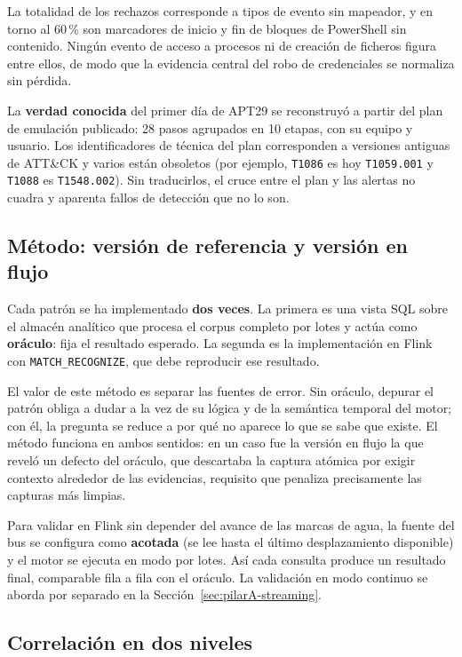La totalidad de los rechazos corresponde a tipos de evento sin mapeador, y en torno al 60\,\%
son marcadores de inicio y fin de bloques de PowerShell sin contenido. Ningún evento de
acceso a procesos ni de creación de ficheros figura entre ellos, de modo que la evidencia
central del robo de credenciales se normaliza sin pérdida.

La \textbf{verdad conocida} del primer día de APT29 se reconstruyó a partir del plan de
emulación publicado: 28 pasos agrupados en 10 etapas, con su equipo y usuario. Los
identificadores de técnica del plan corresponden a versiones antiguas de ATT\&CK y varios
están obsoletos (por ejemplo, \texttt{T1086} es hoy \texttt{T1059.001} y \texttt{T1088} es
\texttt{T1548.002}). Sin traducirlos, el cruce entre el plan y las alertas no cuadra y
aparenta fallos de detección que no lo son.

\subsection{Método: versión de referencia y versión en flujo}

Cada patrón se ha implementado \textbf{dos veces}. La primera es una vista SQL sobre el
almacén analítico que procesa el corpus completo por lotes y actúa como
\textbf{oráculo}: fija el resultado esperado. La segunda es la implementación en Flink con
\texttt{MATCH\_RECOGNIZE}, que debe reproducir ese resultado.

El valor de este método es separar las fuentes de error. Sin oráculo, depurar el patrón
obliga a dudar a la vez de su lógica y de la semántica temporal del motor; con él, la
pregunta se reduce a por qué no aparece lo que se sabe que existe. El método funciona en
ambos sentidos: en un caso fue la versión en flujo la que reveló un defecto del oráculo, que
descartaba la captura atómica por exigir contexto alrededor de las evidencias, requisito que
penaliza precisamente las capturas más limpias.

Para validar en Flink sin depender del avance de las marcas de agua, la fuente del bus se
configura como \textbf{acotada} (se lee hasta el último desplazamiento disponible) y el
motor se ejecuta en modo por lotes. Así cada consulta produce un resultado final, comparable
fila a fila con el oráculo. La validación en modo continuo se aborda por separado en la
Sección~\ref{sec:pilarA-streaming}.

\subsection{Correlación en dos niveles}
\label{sec:dos-niveles}

